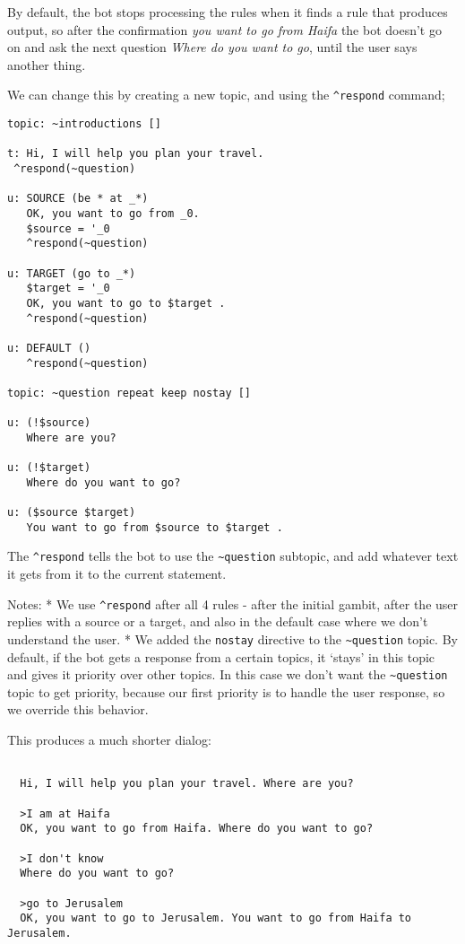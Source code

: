 \documentclass[]{article}
\begin{document}
By default, the bot stops processing the rules when it finds a rule that
produces output, so after the confirmation \emph{you want to go from
Haifa} the bot doesn't go on and ask the next question \emph{Where do
you want to go}, until the user says another thing.

We can change this by creating a new topic, and using the
\texttt{\^{}respond} command;

\begin{verbatim}
topic: ~introductions []

t: Hi, I will help you plan your travel.
 ^respond(~question)

u: SOURCE (be * at _*)
   OK, you want to go from _0.
   $source = '_0
   ^respond(~question)

u: TARGET (go to _*)
   $target = '_0
   OK, you want to go to $target .
   ^respond(~question)

u: DEFAULT ()
   ^respond(~question)

topic: ~question repeat keep nostay []

u: (!$source)
   Where are you?

u: (!$target)
   Where do you want to go?

u: ($source $target)
   You want to go from $source to $target . 
\end{verbatim}

The \texttt{\^{}respond} tells the bot to use the
\texttt{\textasciitilde{}question} subtopic, and add whatever text it
gets from it to the current statement.

Notes: * We use \texttt{\^{}respond} after all 4 rules - after the
initial gambit, after the user replies with a source or a target, and
also in the default case where we don't understand the user. * We added
the \texttt{nostay} directive to the \texttt{\textasciitilde{}question}
topic. By default, if the bot gets a response from a certain topics, it
`stays' in this topic and gives it priority over other topics. In this
case we don't want the \texttt{\textasciitilde{}question} topic to get
priority, because our first priority is to handle the user response, so
we override this behavior.

This produces a much shorter dialog:

\begin{verbatim}

  Hi, I will help you plan your travel. Where are you?

  >I am at Haifa
  OK, you want to go from Haifa. Where do you want to go?

  >I don't know
  Where do you want to go?

  >go to Jerusalem
  OK, you want to go to Jerusalem. You want to go from Haifa to Jerusalem.
\end{verbatim}
\end{document}
